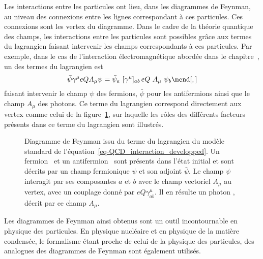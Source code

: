 \par Les interactions entre les particules ont lieu, dans les diagrammes de Feynman, au niveau des connexions entre les lignes correspondant à ces particules.
Ces connexions sont les \og vertex \fg{} du diagramme.
Dans le cadre de la théorie quantique des champs, les interactions entre les particules sont possibles grâce aux termes du lagrangien faisant intervenir les champs correspondants à ces particules.
Par exemple, dans le cas de l'interaction électromagnétique abordée dans le chapitre~, un des termes du lagrangien est
\begin{equation}
\bar{\psi}\gamma^\mu eQA_\mu \psi
=
\bar{\psi}_a \,\, [\gamma^\mu]_{ab} \, eQ \,\, A_\mu \,\, \psi_b
\mend[,]
\label{eq-QCD_interaction_developped}
\end{equation}
faisant intervenir le champ $\psi$ des fermions, $\bar{\psi}$ pour les antifermions ainsi que le champ $A_\mu$ des photons.
Ce terme du lagrangien correspond directement aux vertex comme celui de la figure~\ref{fig-fgraph-ff_Gamma1-large-annexeB}, sur laquelle les rôles des différents facteurs présents dans ce terme du lagrangien sont illustrés.
\begin{figure}[h]
\centering
\vspace{\baselineskip}

\vspace{\baselineskip}
\caption[Diagramme de Feynman issu du terme~\eqref{eq-QCD_interaction_developped}.]{Diagramme de Feynman issu du terme du lagrangien du modèle standard de l'équation~\eqref{eq-QCD_interaction_developped}. Un fermion \fermion\ et un antifermion \antifermion\ sont présents dans l'état initial et sont décrits par un champ fermionique $\psi$ et son adjoint $\bar{\psi}$. Le champ $\psi$ interagit par ses composantes $a$ et $b$ avec le champ vectoriel $A_\mu$ au vertex, avec un couplage donné par $eQ\gamma^\mu_{ab}$. Il en résulte un photon \photon, décrit par ce champ $A_\mu$.}
\label{fig-fgraph-ff_Gamma1-large-annexeB}
\end{figure}
\par Les diagrammes de Feynman ainsi obtenus sont un outil incontournable en physique des particules.
En physique nucléaire et en physique de la matière condensée, le formalisme étant proche de celui de la physique des particules, des analogues des diagrammes de Feynman sont également utilisés.